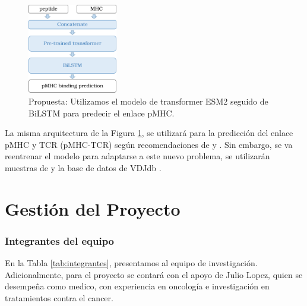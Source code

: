 \documentclass[a4paper]{article}
\begin{document}
\begin{figure}[H]
	\centering
	\includegraphics[width=0.35\textwidth]{../img/pipeline/proposal_pmhc}
	\caption{Propuesta: Utilizamos el modelo de transformer ESM2 seguido de BiLSTM para predecir el enlace pMHC.}
	\label{fig:proposal}
\end{figure}

La misma arquitectura de la Figura \ref{fig:proposal}, se utilizará para la predicción del enlace pMHC y TCR (pMHC-TCR) según recomendaciones de \cite{li2020progeo}  y \cite{myronov2023bertrand}. Sin embargo, se va reentrenar el modelo para adaptarse a este nuevo problema, se utilizarán muestras de \cite{li2020progeo} y la base de datos de VDJdb \citep{shugay2018vdjdb}.






	
	
	

\clearpage


\part*{Gestión del Proyecto}

\setcounter{section}{0}


\section{Integrantes del equipo}
En la Tabla \ref{tab:integrantes}, presentamos al equipo de investigación. Adicionalmente, para el proyecto se contará con el apoyo de Julio Lopez, quien se desempeña como medico, con experiencia en oncología e investigación en tratamientos contra el cancer.
 
\end{document}
